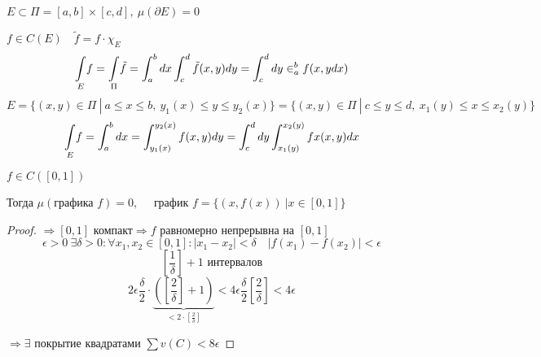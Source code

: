     \begin{illustration}
        $E \subset \Pi = [a, b] \times [c, d], \ \mu (\partial E) = 0$
        \par $f \in C(E) \quad \tilde{f} = f \cdot \chi_E$
        \[
            \underset{E}{\int} f = \underset{\Pi}{\int} \tilde{f} = \int_a^b dx \int_c^d \tilde{f}(x, y)dy = \int_c^d dy \in_a^b f(x, ydx)    
        \]
        \[
            E = \{(x, y) \in \Pi \ | \ a \le x \le b, \ y_1(x) \le y \le y_2(x)\} = \{(x, y) \in \Pi \ | \ c \le y \le d , \ x_1(y) \le x \le x_2(y)\}   
        \]
        \[
            \underset{E}{\int} f = \int_a^b dx = \int_{y_1(x)}^{y_2(x)} f(x, y) dy = \int_c^d dy \int_{x_1(y)}^{x_2(y)} fx(x, y)dx    
        \]
    \end{illustration}

    \begin{remark}
        $f \in C([0, 1])$
        \par Тогда $\mu(\text{графика } f) = 0, \quad$ график $f = \{(x, f(x)) \ | x \in [0, 1]\}$
    \end{remark}
    \begin{proof}
        $\Rightarrow [0, 1] \text{ компакт} \Rightarrow f $ равномерно непрерывна на $[0, 1]$
        \[
            \epsilon > 0 \ \exists \delta > 0 : \forall x_1, x_2 \in [0, 1] : |x_1 - x_2| < \delta \quad |f(x_1) - f(x_2)| < \epsilon
        \]
        \[
            \left[\frac 1 \delta\right] + 1 \text{ интервалов}    
        \]
        \[
            2\epsilon \frac \delta 2 \cdot \underbrace{\left(\left[\frac 2 \delta\right] + 1\right)}_{< 2 \cdot \left[\frac 2 \delta\right]} < 4 \epsilon \frac \delta 2 \left[\frac 2 \delta\right] < 4 \epsilon
        \] %
        \par {}
        \par {} %
        \par $\Rightarrow \exists$ покрытие квадратами $\sum v(C) < 8 \epsilon$
    \end{proof}

